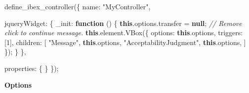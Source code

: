 \documentclass[
]{article}
\newenvironment{Shaded}{}{}
\newcommand{\AttributeTok}[1]{\textcolor[rgb]{0.49,0.56,0.16}{#1}}
\newcommand{\CommentTok}[1]{\textcolor[rgb]{0.38,0.63,0.69}{\textit{#1}}}
\newcommand{\DataTypeTok}[1]{\textcolor[rgb]{0.56,0.13,0.00}{#1}}
\newcommand{\DecValTok}[1]{\textcolor[rgb]{0.25,0.63,0.44}{#1}}
\newcommand{\FunctionTok}[1]{\textcolor[rgb]{0.02,0.16,0.49}{#1}}
\newcommand{\KeywordTok}[1]{\textcolor[rgb]{0.00,0.44,0.13}{\textbf{#1}}}
\newcommand{\NormalTok}[1]{#1}
\newcommand{\OperatorTok}[1]{\textcolor[rgb]{0.40,0.40,0.40}{#1}}
\newcommand{\StringTok}[1]{\textcolor[rgb]{0.25,0.44,0.63}{#1}}
\begin{document}
\begin{Shaded}
\begin{Highlighting}[]
\FunctionTok{define\_ibex\_controller}\NormalTok{(\{}
    \DataTypeTok{name}\OperatorTok{:} \StringTok{"MyController"}\OperatorTok{,}

    \DataTypeTok{jqueryWidget}\OperatorTok{:}\NormalTok{ \{}
        \DataTypeTok{\_init}\OperatorTok{:} \KeywordTok{function}\NormalTok{ () \{}
            \KeywordTok{this}\OperatorTok{.}\AttributeTok{options}\OperatorTok{.}\AttributeTok{transfer} \OperatorTok{=} \KeywordTok{null}\OperatorTok{;} \CommentTok{// Remove \textquotesingle{}click to continue message\textquotesingle{}.}
            \KeywordTok{this}\OperatorTok{.}\AttributeTok{element}\OperatorTok{.}\FunctionTok{VBox}\NormalTok{(\{}
                \DataTypeTok{options}\OperatorTok{:} \KeywordTok{this}\OperatorTok{.}\AttributeTok{options}\OperatorTok{,}
                \DataTypeTok{triggers}\OperatorTok{:}\NormalTok{ [}\DecValTok{1}\NormalTok{]}\OperatorTok{,}
                \DataTypeTok{children}\OperatorTok{:}\NormalTok{ [}
                    \StringTok{"Message"}\OperatorTok{,} \KeywordTok{this}\OperatorTok{.}\AttributeTok{options}\OperatorTok{,}
                    \StringTok{"AcceptabilityJudgment"}\OperatorTok{,} \KeywordTok{this}\OperatorTok{.}\AttributeTok{options}\OperatorTok{,}
\NormalTok{                ]}
\NormalTok{            \})}\OperatorTok{;}
\NormalTok{        \}}
\NormalTok{    \}}\OperatorTok{,}

    \DataTypeTok{properties}\OperatorTok{:}\NormalTok{ \{ \}}
\NormalTok{\})}\OperatorTok{;}
\end{Highlighting}
\end{Shaded}

\textbf{Options}
\end{document}
